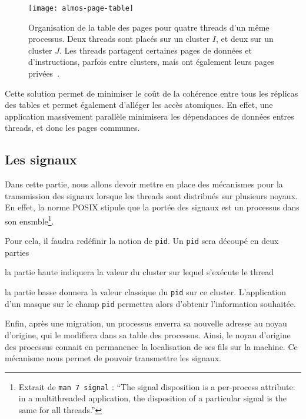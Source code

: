       \begin{figure}[ht]
        \centering
        \texttt{[image: almos-page-table]}
        \caption{Organisation de la table des pages pour quatre threads d'un
          même processus. Deux threads sont placés sur un cluster $I$, et deux
          sur un cluster $J$. Les threads partagent certaines pages de données
          et d'instructions, parfois entre clusters, mais ont également leurs
          pages privées~\citep{almaless2014universite}.}
        \label{fig:almos-page-table}
      \end{figure}

      Cette solution permet de minimiser le coût de la cohérence entre tous les
      réplicas des tables et permet également d'alléger les accès atomiques. En
      effet, une application massivement parallèle minimisera les dépendances de
      données entres threads, et donc les pages communes.


    \subsection{Les signaux}

      Dans cette partie, nous allons devoir mettre en place des mécanismes pour
      la transmission des signaux lorsque les threads sont distribués sur
      plusieurs noyaux. En effet, la norme POSIX stipule que la portée des
      signaux est un processus dans son ensmble\footnote{Extrait de \texttt{man
          7 signal} : ``The signal disposition is a per-process attribute: in a
        multithreaded application, the disposition of a particular signal is the
        same for all threads.''}.

      Pour cela, il faudra redéfinir la notion de \texttt{pid}. Un \texttt{pid}
      sera découpé en deux parties \benumline \item la partie haute indiquera la
      valeur du cluster sur lequel s'exécute le thread \item la partie basse
      donnera la valeur classique du \texttt{pid} sur ce
      cluster\eenumline. L'application d'un masque sur le champ \texttt{pid}
      permettra alors d'obtenir l'information souhaitée.

      Enfin, après une migration, un processus enverra sa nouvelle adresse au
      noyau d'origine, qui le modifiera dans sa table des processus. Ainsi, le
      noyau d'origine des processus connait en permanence la localisation de ses
      fils sur la machine. Ce mécanisme nous permet de pouvoir transmettre les
      signaux.


